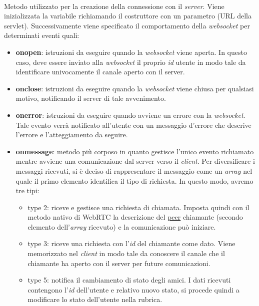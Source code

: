 \begin{description}
\item{}\\
Metodo utilizzato per la creazione della connessione con il \textit{server}. Viene inizializzata la variabile  richiamando il costruttore con un parametro (URL della servlet). Successivamente viene specificato il comportamento della \textit{websocket} per determinati eventi quali:
\begin{itemize}
\item \textbf{onopen}: istruzioni da eseguire quando la \textit{websocket} viene aperta. In questo caso, deve essere inviato alla \textit{websocket} il proprio \textit{id} utente in modo tale da identificare univocamente il canale aperto con il server.
\item \textbf{onclose}: istruzioni da eseguire quando la \textit{websocket} viene chiusa per qualsiasi motivo, notificando il server di tale avvenimento.
\item \textbf{onerror}: istruzioni da eseguire quando avviene un errore con la \textit{websocket}. Tale evento verrà notificato all'utente con un messaggio d'errore che descrive l'errore e l'atteggiamento da seguire.
\item \textbf{onmessage}: metodo più corposo in quanto gestisce l'unico evento richiamato mentre avviene una comunicazione dal server verso il \textit{client}. Per diversificare i messaggi ricevuti, si è deciso di rappresentare il messaggio come un \textit{array} nel quale il primo elemento identifica il tipo di richiesta. In questo modo, avremo tre tipi:
\begin{itemize}
\item type 2: riceve e gestisce una richiesta di chiamata. Imposta quindi con il metodo nativo di WebRTC  la descrizione del \underline{peer} chiamante (secondo elemento dell'\textit{array} ricevuto) e la comunicazione può iniziare.
\item type 3: riceve una richiesta con l'\textit{id} del chiamante come dato. Viene memorizzato nel \textit{client} in modo tale da conoscere il canale che il chiamante ha aperto con il server per future comunicazioni.
\item type 5: notifica il cambiamento di stato degli amici. I dati ricevuti contengono l'\textit{id} dell'utente e relativo nuovo stato, si procede quindi a modificare lo stato dell'utente nella rubrica.
\end{itemize}
\end{itemize}
 

\end{description}
